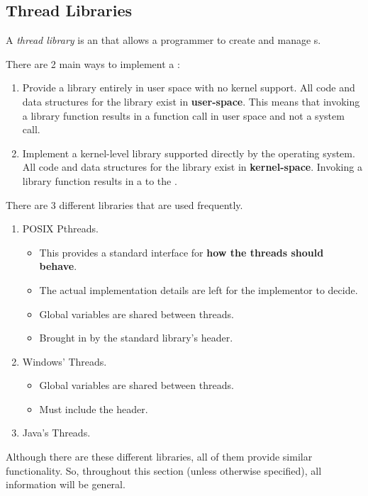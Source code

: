 \subsection{Thread Libraries}\label{subsec:Thread_Libraries}
\begin{definition}\label{def:Thread_Library}
  A \emph{thread library} is an  that allows a programmer to create and manage s.
\end{definition}

There are 2 main ways to implement a :
\begin{enumerate}[noitemsep]
\item Provide a library entirely in user space with no kernel support.
  All code and data structures for the library exist in \textbf{user-space}.
  This means that invoking a library function results in a function call in user space and not a system call.
\item Implement a kernel-level library supported directly by the operating system.
  All code and data structures for the library exist in \textbf{kernel-space}.
  Invoking a library function results in a  to the .
\end{enumerate}

There are 3 different libraries that are used frequently.
\begin{enumerate}[noitemsep]
\item POSIX Pthreads.
  \begin{itemize}[noitemsep]
  \item This provides a standard interface for \textbf{how the threads should behave}.
  \item The actual implementation details are left for the implementor to decide.
  \item Global variables are shared between threads.
  \item Brought in by the standard library's  header.
  \end{itemize}
\item Windows' Threads.
  \begin{itemize}[noitemsep]
  \item Global variables are shared between threads.
  \item Must include the  header.
  \end{itemize}
\item Java's Threads.
\end{enumerate}

Although there are these different libraries, all of them provide similar functionality.
So, throughout this section (unless otherwise specified), all information will be general.


